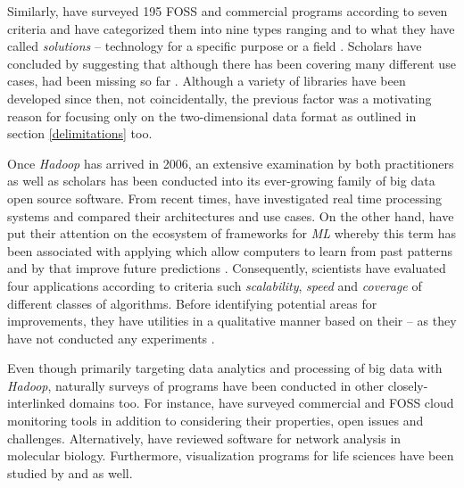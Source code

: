 Similarly, \textcite{Mikut2011} have surveyed 195 \ac{FOSS} and commercial programs according to seven criteria and have categorized them into nine types ranging  and to what they have called \emph{solutions} -- technology for a specific purpose or a field \parencite[11]{Mikut2011}.
Scholars have concluded by suggesting that although there has been  covering many different use cases,  had been missing so far \parencite[11]{Mikut2011}.
Although a variety of libraries have been developed since then, not coincidentally, the previous factor was a motivating reason for focusing only on the two-dimensional data format as outlined in section \ref{delimitations} too. 

Once \emph{Hadoop} has arrived in 2006, an extensive examination by both practitioners as well as scholars has been conducted into its ever-growing family of big data open source software.
From recent times, \textcite{Liu2014} have investigated real time processing systems and compared their architectures and use cases. 
On the other hand, \textcite{Lara2015BigData} have put their attention on the ecosystem of frameworks for \emph{\ac{ML}} whereby this term has been associated with applying  which allow computers to learn from past patterns and by that improve future predictions \parencites[357]{FosterProvost2013DataThinking}. 
Consequently, scientists have evaluated four applications according to criteria such \emph{scalability}, \emph{speed} and \emph{coverage} of different classes of algorithms.
Before identifying potential areas for improvements, they have  utilities in a qualitative manner based on their  -- as they have not conducted any experiments \parencite[27-28]{Lara2015BigData}.

Even though primarily targeting data analytics and processing of big data with \emph{Hadoop}, naturally surveys of programs have been conducted in other closely-interlinked domains too.
For instance, \textcite{Acetp2013} have surveyed commercial and \ac{FOSS} cloud monitoring tools in addition to considering their properties, open issues and challenges.
Alternatively, \textcite{ThomasSterling2010} have reviewed software for network analysis in molecular biology.
Furthermore, visualization programs for life sciences have been studied by \textcite{PavlopoulosBio2008} and \textcite{Pabinger2014} as well. 

